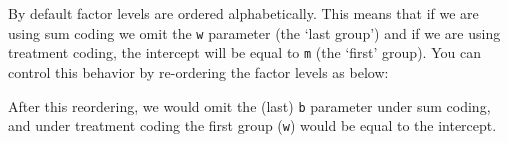 \documentclass[
]{book}
\newenvironment{Shaded}{\begin{snugshade}}{\end{snugshade}}
\newcommand{\AttributeTok}[1]{\textcolor[rgb]{0.77,0.63,0.00}{#1}}
\newcommand{\CommentTok}[1]{\textcolor[rgb]{0.56,0.35,0.01}{\textit{#1}}}
\newcommand{\DocumentationTok}[1]{\textcolor[rgb]{0.56,0.35,0.01}{\textbf{\textit{#1}}}}
\newcommand{\FunctionTok}[1]{\textcolor[rgb]{0.00,0.00,0.00}{#1}}
\newcommand{\NormalTok}[1]{#1}
\newcommand{\OtherTok}[1]{\textcolor[rgb]{0.56,0.35,0.01}{#1}}
\newcommand{\SpecialCharTok}[1]{\textcolor[rgb]{0.00,0.00,0.00}{#1}}
\newcommand{\StringTok}[1]{\textcolor[rgb]{0.31,0.60,0.02}{#1}}
\begin{document}
\begin{Shaded}
\end{Shaded}

By default factor levels are ordered alphabetically. This means that if we are using sum coding we omit the \texttt{w} parameter (the `last group') and if we are using treatment coding, the intercept will be equal to \texttt{m} (the `first' group). You can control this behavior by re-ordering the factor levels as below:

\begin{Shaded}
\end{Shaded}

After this reordering, we would omit the (last) \texttt{b} parameter under sum coding, and under treatment coding the first group (\texttt{w}) would be equal to the intercept.
\end{document}
